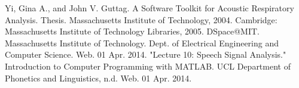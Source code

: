 \documentclass{article}
\begin{document}
\newpage

\begin{thebibliography}{9}

	Yi, Gina A., and John V. Guttag. A Software Toolkit for Acoustic Respiratory Analysis. Thesis. Massachusetts Institute of Technology, 2004. Cambridge: Massachusetts Institute of Technology Libraries, 2005. DSpace@MIT. Massachusetts Institute of Technology. Dept. of Electrical Engineering and Computer Science. Web. 01 Apr. 2014.
	"Lecture 10: Speech Signal Analysis." Introduction to Computer Programming with MATLAB. UCL Department of Phonetics and Linguistics, n.d. Web. 01 Apr. 2014.

\end{thebibliography}
\end{document}
